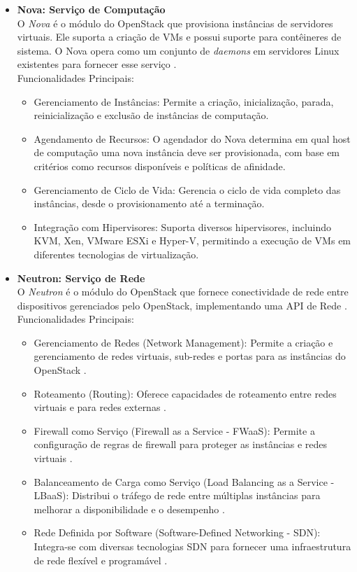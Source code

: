 \begin{itemize}
\begin{itemize}
    \item \textbf{Nova: Serviço de Computação}\\
    O \textit{Nova} é o módulo do OpenStack que provisiona instâncias de servidores virtuais. Ele suporta a criação de VMs e possui suporte para contêineres de sistema. O Nova opera como um conjunto de \textit{daemons} em servidores Linux existentes para fornecer esse serviço \cite{openstack2025}.\\
    Funcionalidades Principais:
    \begin{itemize}
        \item Gerenciamento de Instâncias: Permite a criação, inicialização, parada, reinicialização e exclusão de instâncias de computação.
        \item Agendamento de Recursos: O agendador do Nova determina em qual host de computação uma nova instância deve ser provisionada, com base em critérios como recursos disponíveis e políticas de afinidade.
        \item Gerenciamento de Ciclo de Vida: Gerencia o ciclo de vida completo das instâncias, desde o provisionamento até a terminação.
        \item Integração com Hipervisores: Suporta diversos hipervisores, incluindo KVM, Xen, VMware ESXi e Hyper-V, permitindo a execução de VMs em diferentes tecnologias de virtualização.
    \end{itemize}

    \item \textbf{Neutron: Serviço de Rede}\\
    O \textit{Neutron} é o módulo do OpenStack que fornece conectividade de rede entre dispositivos gerenciados pelo OpenStack, implementando uma API de Rede \cite{openstack2025}.\\
    Funcionalidades Principais:
    \begin{itemize}
        \item Gerenciamento de Redes (Network Management): Permite a criação e gerenciamento de redes virtuais, sub-redes e portas para as instâncias do OpenStack \cite{openstack2025}.
        \item Roteamento (Routing): Oferece capacidades de roteamento entre redes virtuais e para redes externas \cite{openstack2025}.
        \item Firewall como Serviço (Firewall as a Service - FWaaS): Permite a configuração de regras de firewall para proteger as instâncias e redes virtuais \cite{openstack2025}.
        \item Balanceamento de Carga como Serviço (Load Balancing as a Service - LBaaS): Distribui o tráfego de rede entre múltiplas instâncias para melhorar a disponibilidade e o desempenho \cite{openstack2025}.
        \item Rede Definida por Software (Software-Defined Networking - SDN): Integra-se com diversas tecnologias SDN para fornecer uma infraestrutura de rede flexível e programável \cite{openstack2025}.
    \end{itemize}


\end{itemize}
\end{itemize}
